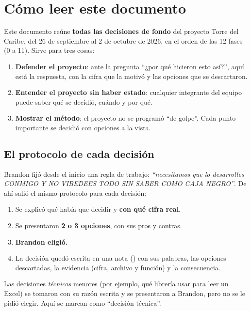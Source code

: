 \chapter*{Cómo leer este documento}

Este documento reúne \textbf{todas las decisiones de fondo} del proyecto Torre del Caribe, del 26 de septiembre al 2 de
octubre de 2026, en el orden de las 12 fases (0 a 11). Sirve para tres cosas:
\begin{enumerate}
\item \textbf{Defender el proyecto}: ante la pregunta ``¿por qué hicieron esto así?'', aquí está la respuesta, con la cifra
  que la motivó y las opciones que se descartaron.
\item \textbf{Entender el proyecto sin haber estado}: cualquier integrante del equipo puede saber qué se decidió, cuándo y
  por qué.
\item \textbf{Mostrar el método}: el proyecto no se programó ``de golpe''. Cada punto importante se decidió con opciones a
  la vista.
\end{enumerate}

\section*{El protocolo de cada decisión}
Brandon fijó desde el inicio una regla de trabajo: \emph{``necesitamos que lo desarrolles CONMIGO Y NO VIBEDEES TODO SIN
SABER COMO CAJA NEGRO''}. De ahí salió el mismo protocolo para cada decisión:
\begin{enumerate}
\item Se explicó qué había que decidir y \textbf{con qué cifra real}.
\item Se presentaron \textbf{2 o 3 opciones}, con sus pros y contras.
\item \textbf{Brandon eligió.}
\item La decisión quedó escrita en una nota () con sus palabras, las opciones
  descartadas, la evidencia (cifra, archivo y función) y la consecuencia.
\end{enumerate}
Las decisiones \emph{técnicas} menores (por ejemplo, qué librería usar para leer un Excel) se tomaron con su razón escrita y
se presentaron a Brandon, pero no se le pidió elegir. Aquí se marcan como ``decisión técnica''.

